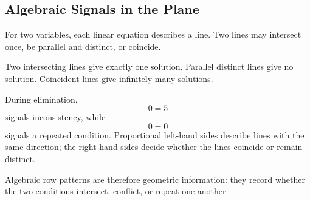 \subsection{Algebraic Signals in the Plane}

For two variables, each linear equation describes a line. Two lines may intersect once, be parallel and distinct, or coincide.

\begin{corebox}
Two intersecting lines give exactly one solution. Parallel distinct lines give no solution. Coincident lines give infinitely many solutions.
\end{corebox}

During elimination,
\[
0=5
\]
signals inconsistency, while
\[
0=0
\]
signals a repeated condition. Proportional left-hand sides describe lines with the same direction; the right-hand sides decide whether the lines coincide or remain distinct.

Algebraic row patterns are therefore geometric information: they record whether the two conditions intersect, conflict, or repeat one another.